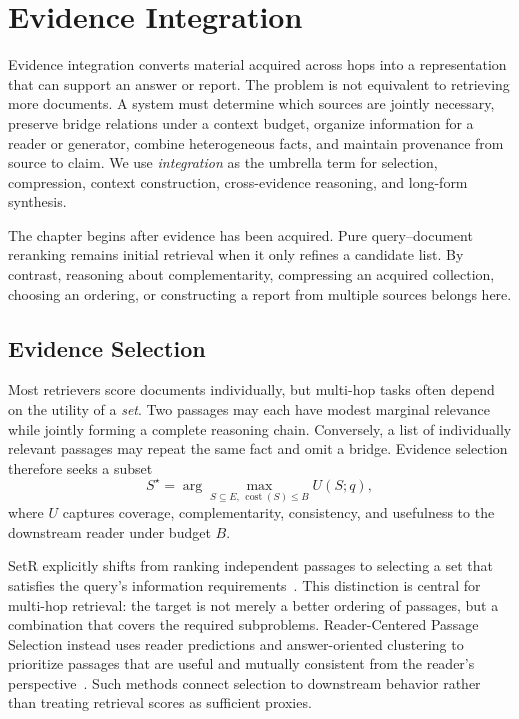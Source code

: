 \section{Evidence Integration}
\label{sec:evidence_integration}

Evidence integration converts material acquired across hops into a representation that can support an answer or report. The problem is not equivalent to retrieving more documents. A system must determine which sources are jointly necessary, preserve bridge relations under a context budget, organize information for a reader or generator, combine heterogeneous facts, and maintain provenance from source to claim. We use \emph{integration} as the umbrella term for selection, compression, context construction, cross-evidence reasoning, and long-form synthesis.

The chapter begins after evidence has been acquired. Pure query--document reranking remains initial retrieval when it only refines a candidate list. By contrast, reasoning about complementarity, compressing an acquired collection, choosing an ordering, or constructing a report from multiple sources belongs here.

\subsection{Evidence Selection}
\label{subsec:evidence_selection}

Most retrievers score documents individually, but multi-hop tasks often depend on the utility of a \emph{set}. Two passages may each have modest marginal relevance while jointly forming a complete reasoning chain. Conversely, a list of individually relevant passages may repeat the same fact and omit a bridge. Evidence selection therefore seeks a subset
\[
S^{\star}=\arg\max_{S\subseteq E,\,\operatorname{cost}(S)\leq B}
U(S;q),
\]
where $U$ captures coverage, complementarity, consistency, and usefulness to the downstream reader under budget $B$.

SetR explicitly shifts from ranking independent passages to selecting a set that satisfies the query's information requirements~\cite{lee2025setr}. This distinction is central for multi-hop retrieval: the target is not merely a better ordering of passages, but a combination that covers the required subproblems. Reader-Centered Passage Selection instead uses reader predictions and answer-oriented clustering to prioritize passages that are useful and mutually consistent from the reader's perspective~\cite{xin2025readercps}. Such methods connect selection to downstream behavior rather than treating retrieval scores as sufficient proxies.

